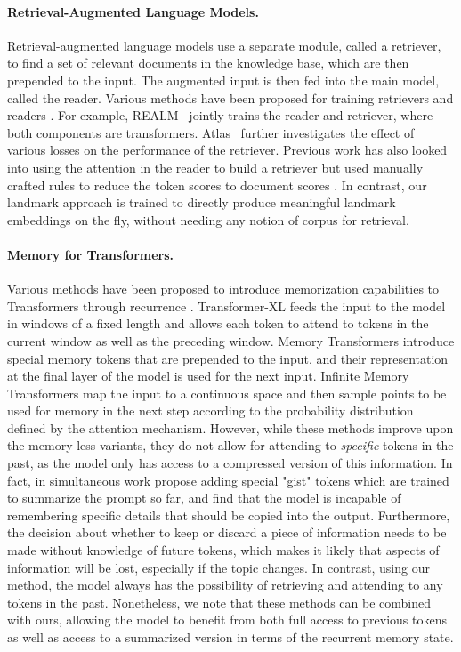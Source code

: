\paragraph{Retrieval-Augmented Language Models.} Retrieval-augmented language models use a separate module, called a retriever, to find a set of relevant documents in the knowledge base, which are then prepended to the input. The augmented input is then fed into the main model, called the reader. Various methods have been proposed for training retrievers and readers \cite{karpukhin_dense_2020}. For example, REALM~\cite{guu_realm_2020} jointly trains the reader and retriever, where both components are transformers. Atlas~\cite{izacard_atlas_2022} further investigates the effect of various losses on the performance of the retriever. Previous work has also looked into using the attention in the reader to build a retriever but used manually crafted rules to reduce the token scores to document scores \cite{khattab_relevance-guided_2021, jiang_retrieval_2022, santhanam_colbertv2_2022}. In contrast, our landmark approach is trained to directly produce meaningful landmark embeddings on the fly, without needing any notion of corpus for retrieval.

\paragraph{Memory for Transformers.} Various methods have been proposed to introduce memorization capabilities to Transformers through recurrence \cite{wu_memformer_2022, bulatov_recurrent_2022}. Transformer-XL \cite{dai_transformer-xl_2019} feeds the input to the model in windows of a fixed length and allows each token to attend to tokens in the current window as well as the preceding window. Memory Transformers \cite{burtsev_memory_2021} introduce special memory tokens that are prepended to the input, and their representation at the final layer of the model is used for the next input. Infinite Memory Transformers \cite{martins_infty-former_2022} map the input to a continuous space and then sample points to be used for memory in the next step according to the probability distribution defined by the attention mechanism. However, while these methods improve upon the memory-less variants, they do not allow for attending to \emph{specific} tokens in the past, as the model only has access to a compressed version of this information. In fact, \citet{mu_learning_2023} in simultaneous work propose adding special "gist" tokens which are trained to summarize the prompt so far, and find that the model is incapable of remembering specific details that should be copied into the output. Furthermore, the decision about whether to keep or discard a piece of information needs to be made without knowledge of future tokens, which makes it likely that aspects of information will be lost, especially if the topic changes. In contrast, using our method, the model always has the possibility of retrieving and attending to any tokens in the past. Nonetheless, we note that these methods can be combined with ours, allowing the model to benefit from both full access to previous tokens as well as access to a summarized version in terms of the recurrent memory state.

